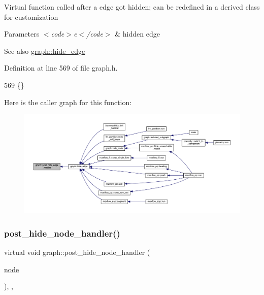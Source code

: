 Virtual function called after a edge got hidden; can be redefined in a derived class for customization


\begin{DoxyParams}{Parameters}
{\em $<$code$>$e$<$/code$>$} & hidden edge \\
\hline
\end{DoxyParams}
\begin{DoxySeeAlso}{See also}
\mbox{\hyperlink{classgraph_ab2f8520bcac080d73c55228fecc61825}{graph\+::hide\+\_\+edge}} 
\end{DoxySeeAlso}


Definition at line 569 of file graph.\+h.


\begin{DoxyCode}
569 \{\}         
\end{DoxyCode}
Here is the caller graph for this function\+:
\nopagebreak
\begin{figure}[H]
\begin{center}
\leavevmode
\includegraphics[width=350pt]{classgraph_ad4614e74a125054eb3e180f6f32ab7bb_icgraph}
\end{center}
\end{figure}
\mbox{\label{classgraph_a50cb72a1e81d0a3d68965a1e6070edb3}} 
\subsubsection{\texorpdfstring{post\+\_\+hide\+\_\+node\+\_\+handler()}{post\_hide\_node\_handler()}}
{\footnotesize\ttfamily virtual void graph\+::post\+\_\+hide\+\_\+node\+\_\+handler (\begin{DoxyParamCaption}\item[{\mbox{\hyperlink{classnode}{node}}}]{ }\end{DoxyParamCaption})\hspace{0.3cm}{\ttfamily [inline]}, {\ttfamily [virtual]}, {\ttfamily [inherited]}}

